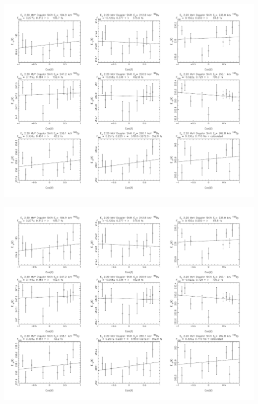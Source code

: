 \begin{center}
\includegraphics[page=13,angle=90,height=0.95\textheight]{162Dy_ftau_220_HE_n.pdf}
\end{center}
\begin{center}
\includegraphics[page=14,angle=90,height=0.95\textheight]{162Dy_ftau_220_HE_n.pdf}
\end{center}
